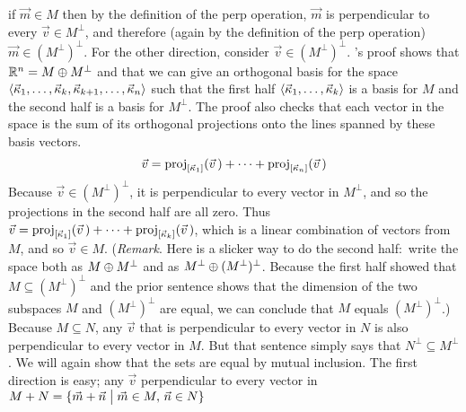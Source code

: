 \begin{exercises}
\begin{answer}
\begin{exparts}
          if $\vec{m}\in M$ then by the definition of the perp operation,
          $\vec{m}$ is perpendicular to every $\vec{v}\in M^\perp$,
          and therefore (again by the definition of the perp operation)
          $\vec{m}\in (M^\perp)^\perp$.
          For the other direction, consider $\vec{v}\in (M^\perp)^\perp$.
          's proof shows that  
          $\Re^n=M\directsum M^\perp$ and that
          we can give an orthogonal basis for the space 
          $\sequence{\vec{\kappa}_1,\dots,\vec{\kappa}_k,
                        \vec{\kappa}_{k+1},\dots,\vec{\kappa}_n}$
          such that the first half
          $\sequence{\vec{\kappa}_1,\dots,\vec{\kappa}_k}$ is a basis for
          $M$ and the second half is a basis for $M^\perp$.
          The proof also checks that
          each vector in the space is the sum of its orthogonal projections 
          onto the lines spanned by these basis vectors.
          \begin{equation*}
             \vec{v}=\proj{\vec{v}\,}{\spanof{\vec{\kappa}_1}}
                          +\dots+\proj{\vec{v}\,}{\spanof{\vec{\kappa}_n}}
          \end{equation*}
          Because $\vec{v}\in (M^\perp)^\perp$, it is perpendicular to 
          every vector in $M^\perp$, and so the projections in 
          the second half are all zero. 
          Thus $\vec{v}=\proj{\vec{v}\,}{\spanof{\vec{\kappa}_1}}
                          +\dots+\proj{\vec{v}\,}{\spanof{\vec{\kappa}_k}}$,
          which is a linear combination of vectors from $M$, and 
          so $\vec{v}\in M$.
          (\textit{Remark}.
           Here is a slicker way to do the second half:~write the space
           both as $M\directsum M^\perp$ and as 
           $M^\perp\directsum (M^\perp)^\perp$.
           Because the first half showed that $M\subseteq (M^\perp)^\perp$
           and the prior sentence shows that the dimension of the two
           subspaces $M$ and $(M^\perp)^\perp$ are equal, we can conclude
           that $M$ equals $(M^\perp)^\perp$.)
        \partsitem Because $M\subseteq N$, any $\vec{v}$ that is perpendicular
           to every vector in $N$ is also perpendicular to every vector in 
           $M$.
           But that sentence simply says that $N^\perp\subseteq M^\perp$.
        \partsitem We will again show that the sets are equal by mutual 
           inclusion.
           The first direction is easy; any $\vec{v}$ perpendicular to
           every vector in 
           $M+N=\set{\vec{m}+\vec{n}\suchthat \vec{m}\in M,\, \vec{n}\in N}$

\end{exparts}
\end{answer}
\end{exercises}
